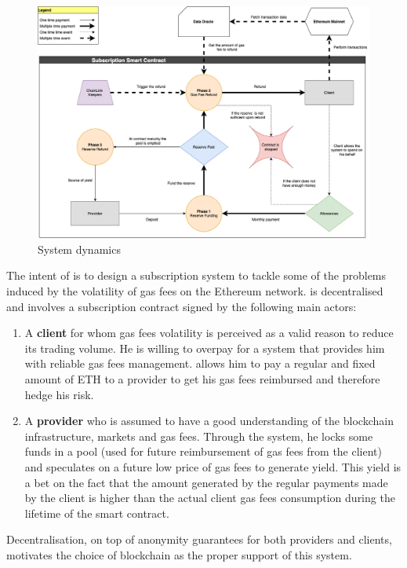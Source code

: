 \begin{figure}[htbp]
\centerline{\includegraphics[scale=0.4]{figures/system-diagram.drawio.png}}
\caption{System dynamics}
\label{fig:system-diagram}
\end{figure}

The intent of {\projectName} is to design a subscription system to tackle some of the problems induced by the volatility of gas fees on the Ethereum network. {\projectName} is decentralised and involves a subscription contract signed by the following main actors:
\begin{enumerate}
    \item A \textbf{client} for whom gas fees volatility is perceived as a valid reason to reduce its trading volume. He is willing to overpay for a system that provides him with reliable gas fees management. {\projectName} allows him to pay a regular and fixed amount of ETH to a provider to get his gas fees reimbursed and therefore hedge his risk.
    \item A \textbf{provider} who is assumed to have a good understanding of the blockchain infrastructure, markets and gas fees. Through the system, he locks some funds in a pool (used for future reimbursement of gas fees from the client) and speculates on a future low price of gas fees to generate yield. This yield is a bet on the fact that the amount generated by the regular payments made by the client is higher than the actual client gas fees consumption during the lifetime of the smart contract.
\end{enumerate}
Decentralisation, on top of anonymity guarantees for both providers and clients, motivates the choice of blockchain as the proper support of this system. 


